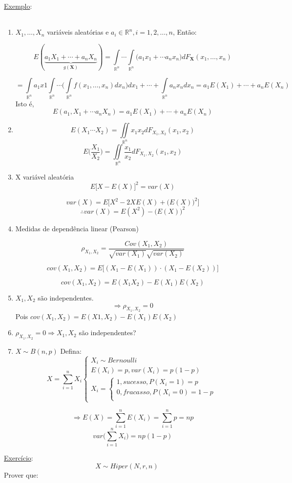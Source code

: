 \documentclass[a4paper,12pt]{article}
\begin{document}
\underline{Exemplo}:\\
\\
\begin{enumerate}[label=\arabic*)]
	\item $X_1,\ldots,X_n$ variáveis aleatórias e $a_i \in \mathbb R^n, i=1,2,\ldots,n$, Então:
	
	$$E(\underbrace{a_1X_1+\cdots + a_nX_n}_{g(\bm X)}) =
	\int\limits_{\mathbb R^n} \cdots	\int\limits_{\mathbb R^n} \bigg(a_1x_1+\cdots a_nx_n\bigg) dF_{\bm X}(x_1,\ldots,x_n)
	$$
	
	
	$$
	= \int\limits_{\mathbb R^n} a_1x1	\int\limits_{\mathbb R^n} \cdots	\bigg(\int\limits_{\mathbb R^n} 
	f(x_1,\ldots,x_n) dx_n \bigg)dx_1
	+\cdots + 
	\int\limits_{\mathbb R^n} a_n x_n dx_n = a_1 E(X_1)+\cdots +a_n E(X_n)
	$$
	Isto é,
	$$E(a_1,X_1+\cdots a_nX_n) =  a_1 E(X_1)+\cdots +a_n E(X_n) $$
	\item $$E(X_1\cdots X_2) = \iint\limits_{\mathbb R^n} x_1 x_2 dF_{X_1,X_2}(x_1,x_2)$$
$$E\bigg(\frac{X_1}{X_2}\bigg) = \iint\limits_{\mathbb R^n} \frac{x_1}{x_2} dF_{X_1,X_2}(x_1,x_2)$$

\item X variável aleatória 
$$E\bigg[
X - E(X)
\bigg]^2 = var(X) $$

$$var(X) =  E\bigg[
X^2 -2XE(X) + \bigg(E(X)\bigg)^2
\bigg]$$
$$\therefore var(X) = E(X^2)-\bigg(E(X)\bigg)^2 $$

\item Medidas de dependência linear (Pearson)

$$\rho_{X_1,X_2} = \frac{Cov(X_1,X_2)}{\sqrt{var(X_1)}\sqrt{var(X_2)}} $$

$$cov(X_1,X_2)= 
E\bigg[
(X_1-E(X_1))\cdot(X_1-E(X_2))
\bigg]
 $$
 
 $$cov(X_1,X_2) = E(X_1X_2) - E(X_1)E(X_2) $$
 
 \item $X_1, X_2$ são independentes.
 $$\Rightarrow \rho_{X_1,X_2} = 0 $$  
 Pois $cov(X_1,X_2) = E(X1,X_2) -E(X_1)E(X_2) $
 
 \item $\rho_{X_1,X_2} = 0 \Rightarrow X_1, X_2$ são independentes?
 \item $X\sim B(n,p)$ 
 Defina:
  $$X = \sum\limits_{i=1}^{n} X_i  \begin{cases}
  X_i\sim Bernoulli\\
  E(X_i)=p, var(X_i)=p(1-p)\\
  X_i = \begin{cases}
  1,sucesso,P(X_i=1)=p\\
  0,fracasso, P(X_i=0)=1-p\\
  \end{cases}
  \end{cases}
  $$
  
  $$ 
  \Rightarrow E(X) = \sum\limits_{i=1}^{n} E(X_i)=\sum\limits_{i=1}^{n}p=np
  $$
  $$var\bigg(
  \sum\limits_{i=1}^{n} X_i
  \bigg)
  =np(1-p)
   $$
\end{enumerate}
\newpage 
\underline{Exercício}:
$$X\sim Hiper(N,r,n) $$
Prover que:
\end{document}
